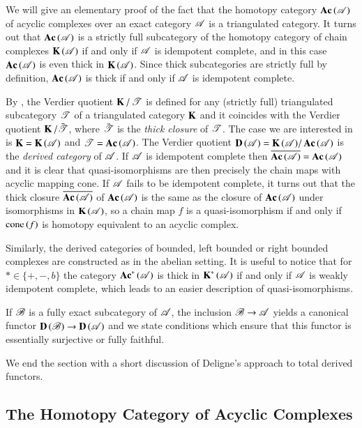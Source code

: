 \documentclass[1p]{elsarticle}
\theoremstyle{mythm}
\theoremstyle{mydef}
\begin{document}
We will give an elementary proof of the fact that the homotopy
category $\Ac{(\scrA)}$ of acyclic complexes over an
exact category $\scrA$ is a triangulated category. It turns out that
$\Ac{(\scrA)}$ is a strictly full subcategory of the homotopy category
of chain complexes $\K{(\scrA)}$ if and
only if $\scrA$ is idempotent complete, and in this case
$\Ac{(\scrA)}$ is even thick in $\K{(\scrA)}$. Since thick
subcategories are strictly full by definition, 
$\Ac{(\scrA)}$ is thick if and only if $\scrA$ is idempotent
complete.

By \cite[Chapter~2]{MR1812507}, the Verdier quotient $\K/\scrT$ is
defined for any (strictly full)
triangulated subcategory $\scrT$ of a triangulated
category $\K$ and it coincides with the Verdier quotient 
$\K / \bar{\scrT}$, where $\bar{\scrT}$ is the \emph{thick closure} of
$\scrT$. The case we are interested in is $\K = \K{(\scrA)}$
and $\scrT = \Ac{(\scrA)}$. The Verdier quotient 
$\D{(\scrA)} = \K{(\scrA)} / \Ac{(\scrA)}$ is the
\emph{derived category} of $\scrA$. If $\scrA$ is idempotent complete then
$\overline{\Ac{(\scrA)}} = \Ac{(\scrA)}$ and it is clear that
quasi-isomorphisms are then precisely the chain maps with acyclic
mapping cone. If $\scrA$ fails to be idempotent complete, it turns out
that the thick closure $\overline{\Ac{(\scrA)}}$ of $\Ac{(\scrA)}$ is
the same as the closure of $\Ac{(\scrA)}$ under isomorphisms in
$\K{(\scrA)}$, so a chain map $f$ is a
quasi-isomorphism if and only if $\cone{(f)}$ is homotopy equivalent
to an acyclic complex.

Similarly, the derived categories of bounded, left bounded or right bounded
complexes are constructed as in the abelian setting. It is useful to
notice that for $\ast \in \{+,-,b\}$ the category
$\Ac^{\ast}{(\scrA)}$ is thick in $\K^{\ast}{(\scrA)}$ if
and only if $\scrA$ is weakly idempotent complete, which leads to an easier
description of quasi-isomorphisms.

If $\scrB$ is a fully exact subcategory of $\scrA$, the inclusion
$\scrB \to \scrA$ yields a canonical functor $\D{(\scrB)} \to
\D{(\scrA)}$ and we state conditions which ensure that this functor is
essentially surjective or fully faithful.

We end the section with a short discussion of Deligne's approach to
total derived functors.


\subsection{The Homotopy Category of Acyclic Complexes}
\end{document}
